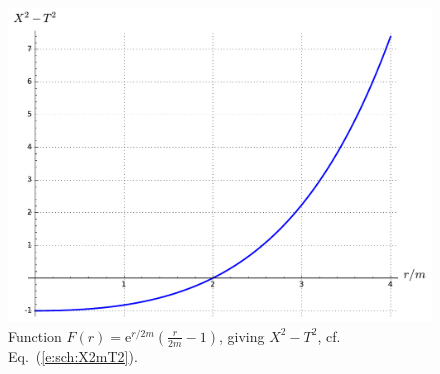 \begin{figure}
\centerline{\includegraphics[height=0.37\textheight]{sch_X2mT2.pdf}}
\caption[]{\label{f:sch:X2mT2} \footnotesize
Function $F(r) = \mathrm{e}^{r/2m} \left( \frac{r}{2m} - 1 \right)$, giving
$X^2-T^2$, cf. Eq.~(\ref{e:sch:X2mT2}).}
\end{figure}


